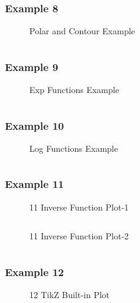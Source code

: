 \documentclass[
  hyper,    
  lang=cn,
  class=book,
  bib_index={load},
  mathSpec={envStyle=leftbar, alias},
  toc={column=2, title=目录},
]{zlatex}
\begin{document}
\subsubsection{Example 8}
\begin{figure}[!htb]
    \centering
    
    \caption{Polar and Contour Example}
    \label{fig:polar-contour-plot}
\end{figure}
\inputminted{latex}{./example_8.tex}
\newpage


\subsubsection{Example 9}
\begin{figure}[!htb]
    \centering
    
    \caption{Exp Functions Example}
    \label{fig:9-exp-functions}
\end{figure}
\inputminted{latex}{./example_9.tex}
\newpage



\subsubsection{Example 10}
\begin{figure}[!htb]
    \centering
    
    \caption{Log Functions Example}
    \label{fig:10-log-function}
\end{figure}
\inputminted{latex}{./example_10.tex}
\newpage


\subsubsection{Example 11}
\begin{figure}[!htb]
    \centering
    
    \caption{11 Inverse Function Plot-1}
    \label{fig:11-inverse-function-1}
\end{figure}
\inputminted{latex}{./example_11_1.tex}

\begin{figure}[!htb]
    \centering
    
    \caption{11 Inverse Function Plot-2}
    \label{fig:11-inverse-function-2}
\end{figure}
\inputminted{latex}{./example_11_2.tex}
\newpage

\subsubsection{Example 12}
\begin{figure}[!htb]
    \centering
    
    \caption{12 TikZ Built-in Plot}
    \label{fig:12-tikz-plot}
\end{figure}
\inputminted{latex}{./example_12.tex}
\newpage
\end{document}
